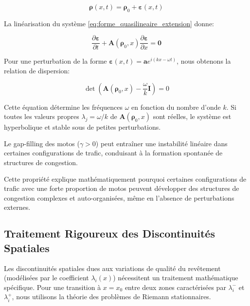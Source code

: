 \begin{equation}
\boldsymbol{\rho}(x,t) = \boldsymbol{\rho}_0 + \boldsymbol{\varepsilon}(x,t)
\end{equation}

La linéarisation du système \eqref{eq:forme_quasilineaire_extension} donne:

\begin{equation}
\frac{\partial \boldsymbol{\varepsilon}}{\partial t} + \mathbf{A}(\boldsymbol{\rho}_0, x) \frac{\partial \boldsymbol{\varepsilon}}{\partial x} = \mathbf{0}
\end{equation}

Pour une perturbation de la forme $\boldsymbol{\varepsilon}(x,t) = \boldsymbol{a} e^{i(kx-\omega t)}$, nous obtenons la relation de dispersion:

\begin{equation}
\det(\mathbf{A}(\boldsymbol{\rho}_0, x) - \frac{\omega}{k}\mathbf{I}) = 0
\end{equation}

Cette équation détermine les fréquences $\omega$ en fonction du nombre d'onde $k$. Si toutes les valeurs propres $\lambda_j = \omega/k$ de $\mathbf{A}(\boldsymbol{\rho}_0, x)$ sont réelles, le système est hyperbolique et stable sous de petites perturbations.

\begin{proposition}
Le gap-filling des motos ($\gamma > 0$) peut entraîner une instabilité linéaire dans certaines configurations de trafic, conduisant à la formation spontanée de structures de congestion.
\end{proposition}

Cette propriété explique mathématiquement pourquoi certaines configurations de trafic avec une forte proportion de motos peuvent développer des structures de congestion complexes et auto-organisées, même en l'absence de perturbations externes.

\subsection{Traitement Rigoureux des Discontinuités Spatiales}
\label{subsec:traitement_discontinuites}

Les discontinuités spatiales dues aux variations de qualité du revêtement (modélisées par le coefficient $\lambda_i(x)$) nécessitent un traitement mathématique spécifique. Pour une transition à $x = x_0$ entre deux zones caractérisées par $\lambda_i^-$ et $\lambda_i^+$, nous utilisons la théorie des problèmes de Riemann stationnaires.

